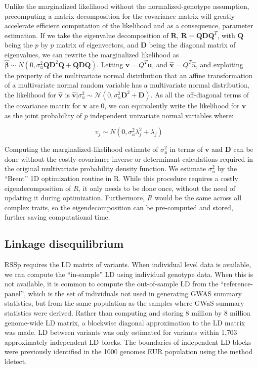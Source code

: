Unlike the marginalized likelihood without the normalized-genotype assumption,
precomputing a matrix decomposition for the covariance matrix will greatly
accelerate efficient computation of the likelihood
and as a consequence, parameter estimation.
If we take the eigenvalue decomposition of $\textbf{R}$, $\textbf{R}=\textbf{Q}\textbf{D}\textbf{Q}^T$, with $\textbf{Q}$ 
being the $p$ by $p$ matrix of
eigenvectors, and $\textbf{D}$ being the diagonal matrix of eigenvalues, we can rewrite the marginalized likelihood as
$\hat{\boldsymbol{\beta}} \sim N(0,\sigma_u^2\textbf{QD}^2\textbf{Q}+\textbf{QDQ})$.  Letting $\textbf{v} = Q^T \textbf{u}$, and 
$\hat{\textbf{v}} = Q^{T}\hat{u}$, and exploiting the property of
the multivariate normal distribution that an affine transformation of a multivariate normal random variable has a multivariate normal distribution, the
likelihood for $\hat{\textbf{v}}$ is $\hat{\textbf{v}}|\sigma_u^2 \sim \mathcal{N}(0,\sigma_u^2\textbf{D}^{2}+\textbf{D})$.  As all the off-diagonal terms of
the covariance matrix for ${\textbf{v}}$ are $0$, we can equivalently write the likelihood for ${\textbf{v}}$ as the joint probability of $p$ independent
univariate normal variables where:

\[ v_j \sim N(0,\sigma^2_u\lambda_j^2+\lambda_j) \]

Computing the marginalized-likelihood estimate of $\sigma^2_u$ in terms of $\textbf{v}$ and $\textbf{D}$ can be done without the costly covariance inverse or determinant calculations required in the original multivariate probability density function.  We estimate $\sigma^2_u$ by the ``Brent'' 1D optimization routine in R\cite{brent1972algorithms}. While this procedure requires a costly eigendecomposition of $R$, it only needs to be done once, without the need of updating it during optimization. Furthermore, $R$ would be the same across all complex traits, so the eigendecomposition can be pre-computed and stored, further saving computational time. 


\subsection{Linkage disequilibrium}\label{sec:org828aaeb}

RSSp requires the LD matrix of variants. When individual level data is available, we can compute the ``in-sample'' LD using individual genotype data. When this is not available, it is common to compute the out-of-sample LD from the ``reference-panel'', which is the set of individuals not used in generating GWAS summary statistics, but from the same population as the samples where GWaS summary statistics were derived. Rather than computing and storing 8 million by 8 million genome-wide LD matrix, a blockwise diagonal approximation to the LD matrix was made.  LD between variants was only estimated for variants within 1,703 approximately independent LD blocks.  The boundaries of independent LD blocks were previously identified in the 1000 genomes EUR population using the method ldetect\cite{ldetect}.  

